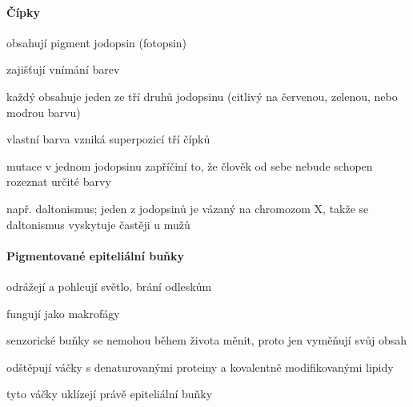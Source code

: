 \documentclass[DIV=8]{scrreprt}
\begin{document}
\paragraph{Čípky}
\begin{myItemize}[nosep]
    \item obsahují pigment jodopsin (fotopsin)
    \item zajišťují vnímání barev
    \item každý obsahuje jeden ze tří druhů jodopsinu (citlivý na červenou, zelenou, nebo modrou barvu)
\begin{myItemize}[nosep]
    \item vlastní barva vzniká superpozicí tří čípků
    \item mutace v jednom jodopsinu zapříčiní to, že člověk od sebe nebude schopen rozeznat určité barvy
\begin{myItemize}[nosep]
    \item např. daltonismus; jeden z jodopsinů je vázaný na chromozom X, takže se daltonismus vyskytuje častěji u mužů
\end{myItemize}

\end{myItemize}

\end{myItemize}




\paragraph{Pigmentované epiteliální buňky}
\begin{myItemize}[nosep]
    \item odrážejí a pohlcují světlo, brání odleskům
    \item fungují jako makrofágy
\begin{myItemize}[nosep]
    \item senzorické buňky se nemohou během života měnit, proto jen vyměňují svůj obsah
    \item odštěpují váčky s denaturovanými proteiny a kovalentně modifikovanými lipidy
    \item tyto váčky uklízejí právě epiteliální buňky
\end{myItemize}

\end{myItemize}
\end{document}
